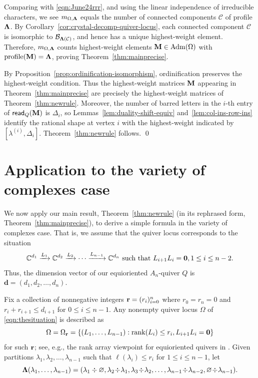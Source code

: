 \documentclass[12pt]{amsart}
\renewcommand{\d}{\mathbf{d}}
\DeclareMathOperator{\Std}{\operatorname{Adm}}
\theoremstyle{definition}
\theoremstyle{remark}
\begin{document}
Comparing with \eqref{eqn:June24rrr}, and using the linear independence of irreducible characters, we see $m_{\Omega,{\bf \Lambda}}$ equals the number of connected components $\mathcal{C}$ of profile ${\bf \Lambda}$. 
By Corollary~\ref{cor:crystal-decomp-quiver-locus}, each connected component ${\mathcal C}$ is
isomorphic to ${\mathcal B}_{{\bf \Lambda}({\mathcal C})}$, and hence has a
unique highest-weight element. Therefore, $m_{\Omega,{\bf \Lambda}}$ counts
highest-weight elements ${\bf M}\in\Std(\Omega)$ with
$\operatorname{profile}({\bf M})={\bf \Lambda}$, proving Theorem~\ref{thm:mainprecise}.

By Proposition~\ref{prop:ordinification-isomorphism}, ordinification preserves the
highest-weight condition. Thus the highest-weight matrices ${\bf M}$ appearing in
Theorem~\ref{thm:mainprecise} are precisely the highest-weight matrices of
Theorem~\ref{thm:newrule}. Moreover, the number of barred letters in the $i$-th entry of 
${\sf read}_Q({\bf M})$  is $\Delta_i$, so
Lemmas~\ref{lem:duality-shift-equiv} and~\ref{lem:col-ins-row-ins}
identify the rational shape at vertex $i$ with the highest-weight indicated by $[\lambda^{(i)},\Delta_i]$. Theorem~\ref{thm:newrule} follows.
\qed


\section{Application to the variety of complexes case}\label{sec:apptocomplex}

We now apply our main result, Theorem~\ref{thm:newrule} (in its rephrased form, Theorem~\ref{thm:mainprecise}), to derive
a simple formula in the variety of complexes case. That is, we assume that the quiver locus corresponds
to the situation
\begin{equation}
\label{eqn:thesituation}
{\mathbb C}^{d_1} \xrightarrow{L_1} {\mathbb C}^{d_2} \xrightarrow{L_2} \cdots \xrightarrow{L_{n-1}} 
{\mathbb C}^{d_n} \text{\ such that } L_{i+1}L_i={\bf 0}, 1\leq i\leq n-2.
\end{equation}
Thus, the dimension vector of our equioriented $A_n$-quiver $Q$ is $\d=(d_1,d_2,\ldots,d_n)$.

Fix a collection of nonnegative 
integers ${\bf r}=(r_i)_{i=0}^{n}$ where $r_0=r_{n}=0$ and $r_i+r_{i+1}\leq d_{i+1}$ for $0\leq i\leq n-1$.
Any nonempty quiver locus $\Omega$ of \eqref{eqn:thesituation} is described as
\[\Omega=\Omega_{\bf r}=\{(L_1,\ldots,L_{n-1}): \operatorname{rank}(L_i)\leq r_i, L_{i+1}L_i={\bf 0}\}\]
for such ${\bf r}$; see, e.g., the rank array viewpoint for equioriented quivers in \cite{BuchFulton}. Given partitions
$\lambda_1,\lambda_2,\ldots,\lambda_{n-1}$ such that $\ell(\lambda_i)\!\leq \! r_i$ for $1\!\leq i\leq\! n-1$, let
\[{\bf \Lambda}(\lambda_1,\ldots,\lambda_{n-1})=(\lambda_1\div \varnothing,\lambda_2\!\div\!\lambda_1,\lambda_3\!\div\!\lambda_2,\ldots,
\lambda_{n-1}\!\div\!\lambda_{n-2},\varnothing\!\div\!\lambda_{n-1}).\]
\end{document}
